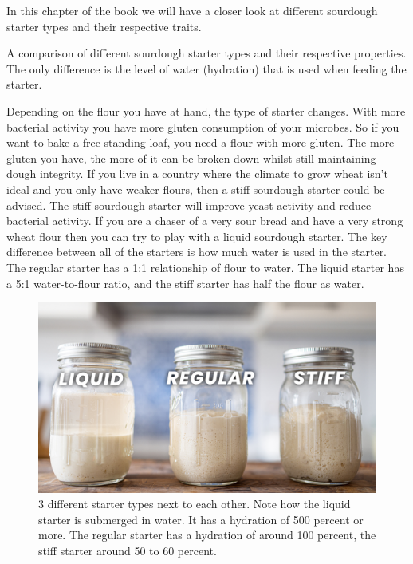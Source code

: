 In this chapter of the book we will have a closer look
at different sourdough starter types and their respective
traits.

\begin{table}[htp!]
    \begin{center}
        
        \caption{A comparison of different sourdough starter types and their
            respective properties. The only difference is the level of water (hydration)
        that is used when feeding the starter.}%
        \label{tab:starter-types-comparison}
    \end{center}
\end{table}

Depending on the flour you have at hand, the type of starter changes. With more
bacterial activity you have more gluten consumption of your microbes. So if
you want to bake a free standing loaf, you need a flour with more gluten. The
more gluten you have, the more of it can be broken down whilst still maintaining
dough integrity. If you live in a country where the climate to grow wheat
isn't ideal and you only have weaker flours, then a stiff sourdough starter
could be advised. The stiff sourdough starter will improve yeast activity and
reduce bacterial activity. If you are a chaser of a very sour bread and have a
very strong wheat flour then you can try to play with a liquid sourdough
starter. The key difference between all of the starters is how much water
is used in the starter. The regular starter has a 1:1 relationship of flour
to water. The liquid starter has a 5:1 water-to-flour ratio, and the stiff
starter has half the flour as water.

\begin{figure}[!htb]
  \includegraphics[width=\textwidth]{sourdough-starter-types}
  \caption{3 different starter types next to each other. Note how the liquid starter is submerged
  in water. It has a hydration of 500 percent or more.
  The regular starter has a hydration of around 100 percent, the stiff starter
around 50 to 60 percent.}%
  \label{fig:starter-types}
\end{figure}


